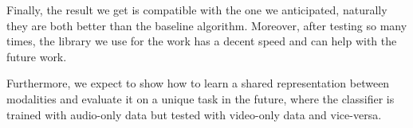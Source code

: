 	Finally, the result we get is compatible with the one we anticipated, naturally they are both better than the baseline algorithm. Moreover, after testing so many times, the library we use for the work has a decent speed and can help with the future work.

Furthermore, we expect to show how to learn a shared representation between modalities and evaluate it on a unique task in the future, where the classifier is trained with audio-only data but tested with video-only data and vice-versa. 

